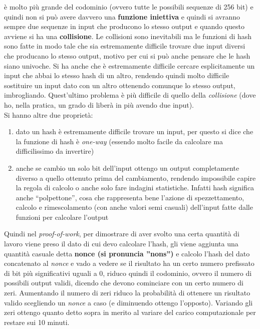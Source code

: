\documentclass[a4paper,12pt, oneside]{book}
\begin{document}
è molto più grande del codominio (ovvero tutte le possibili sequenze di 256 bit)
e quindi non si può avere davvero una \textbf{funzione iniettiva} e quindi si
avranno sempre due sequenze in input che producono lo stesso output e quando
questo avviene si ha una \textbf{collisione}. Le collisioni sono inevitabili ma
le funzioni di hash sono fatte in modo tale che sia estremamente difficile
trovare due input diversi che producano lo stesso output, motivo per cui si può
anche pensare che le hash siano univoche. Si ha anche che è estremamente
difficile cercare esplicitamente un input che abbai lo stesso hash di un altro,
rendendo quindi molto difficile sostituire un input dato con un altro ottenendo
comunque lo stesso output, imbrogliando. Quest'ultimo problema è più difficile
di quello della \textit{collisione} (dove ho, nella pratica, un grado di liberà
in più avendo due input).\\
Si hanno altre due proprietà:
\begin{enumerate}
  \item dato un hash è estremamente difficile trovare un input, per questo si
  dice che la funzione di hash è \textit{one-way} (essendo molto facile da
  calcolare ma difficilissimo da invertire)
  \item anche se cambio un solo bit dell'input ottengo un output completamente
  diverso a quello ottenuto prima del cambiamento, rendendo impossibile capire
  la regola di calcolo o anche solo fare indagini statistiche. Infatti hash
  significa anche ``polpettone'', cosa che rappresenta bene l'azione di
  spezzettamento, calcolo e rimescolamento (con anche valori semi casuali)
  dell'input fatte dalle funzioni per calcolare l'output  
\end{enumerate}
Quindi nel \textit{proof-of-work}, per dimostrare di aver svolto una certa
quantità di lavoro viene preso il dato di cui devo calcolare l'hash, gli viene
aggiunta una quantità casuale detta \textbf{nonce (si pronuncia ''nons'')} e
calcolo l'hash del dato concatenato al \textit{nonce} e vado a vedere se il
risultato ha un certo numero prefissato di bit più significativi uguali a 0,
riduco quindi il codominio, ovvero il numero di possibili output validi, dicendo
che devono cominciare con un certo numero di zeri. Aumentando il numero di zeri
riduco la probabilità di ottenere un risultato valido scegliendo un
\textit{nonce} a caso (e diminuendo ottengo l'opposto). Variando gli zeri
ottengo quanto detto sopra in merito al variare del carico computazionale per
restare sui 10 minuti.\\
\end{document}
